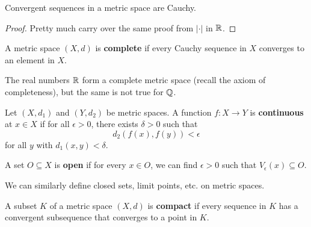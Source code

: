 \begin{prop}
  Convergent sequences in a metric space are Cauchy.
\end{prop}

\begin{proof}
  Pretty much carry over the same proof from
  $| \cdot |$ in $\mathbb{R}$.
\end{proof}

\begin{definition}
  A metric space $(X, d)$ is \textbf{complete} if every
  Cauchy sequence in $X$ converges to an element in $X$.
\end{definition}

\begin{remark}
  The real numbers $\mathbb{R}$ form a complete metric space
  (recall the axiom of completeness),
  but the same is not true for $\mathbb{Q}$.
\end{remark}

\begin{definition}
  Let $(X, d_1)$ and $(Y, d_2)$ be metric spaces.
  A function $f : X \to Y$ is \textbf{continuous} at
  $x \in X$ if for all $\epsilon > 0$, there exists
  $\delta > 0$ such that
  \[d_2(f(x), f(y)) < \epsilon\]
  for all $y$ with $d_1(x, y) < \delta$.
\end{definition}

\begin{definition}
  A set $O \subseteq X$ is \textbf{open} if for every
  $x \in O$, we can find $\epsilon > 0$ such that
  $V_\epsilon(x) \subseteq O$.
\end{definition}

\begin{remark}
  We can similarly define closed sets, limit points, etc.
  on metric spaces.
\end{remark}

\begin{definition}
  A subset $K$ of a metric space $(X, d)$ is \textbf{compact}
  if every sequence in $K$ has a convergent subsequence
  that converges to a point in $K$.
\end{definition}
